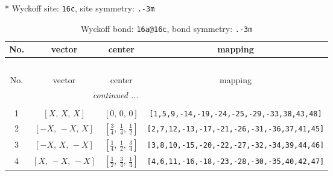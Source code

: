 \documentclass[fleqn,8pt]{jsarticle}
\begin{document}
* Wyckoff site: {\tt 16c}, site symmetry: {\tt .-3m}
\renewcommand{\arraystretch}{1.2}
\begin{longtable}{cccc}
\caption{Wyckoff bond: {\tt 16a@16c}, bond symmetry: {\tt .-3m}}
 \\
 \hline \hline
No. & vector & center & mapping \\ \hline \endfirsthead

\multicolumn{3}{l}{\tablename\ \thetable{}} \\
 \hline \hline
No. & vector & center & mapping \\ \hline \endhead

 \hline \hline
\multicolumn{3}{r}{\footnotesize\it continued ...} \\ \endfoot

 \hline \hline
\multicolumn{3}{r}{} \\ \endlastfoot

1 & $\left[ X,\, X,\, X \right]$ & $\left[ 0,\, 0,\, 0 \right]$ & {\tt [1,5,9,-14,-19,-24,-25,-29,-33,38,43,48]} \\ \hline
2 & $\left[ - X,\, - X,\, X \right]$ & $\left[ \frac{3}{4},\, \frac{1}{4},\, \frac{1}{2} \right]$ & {\tt [2,7,12,-13,-17,-21,-26,-31,-36,37,41,45]} \\ \hline
3 & $\left[ - X,\, X,\, - X \right]$ & $\left[ \frac{1}{4},\, \frac{1}{2},\, \frac{3}{4} \right]$ & {\tt [3,8,10,-15,-20,-22,-27,-32,-34,39,44,46]} \\ \hline
4 & $\left[ X,\, - X,\, - X \right]$ & $\left[ \frac{1}{2},\, \frac{3}{4},\, \frac{1}{4} \right]$ & {\tt [4,6,11,-16,-18,-23,-28,-30,-35,40,42,47]} \\
\end{longtable}
\renewcommand{\arraystretch}{1.2}
\end{document}
